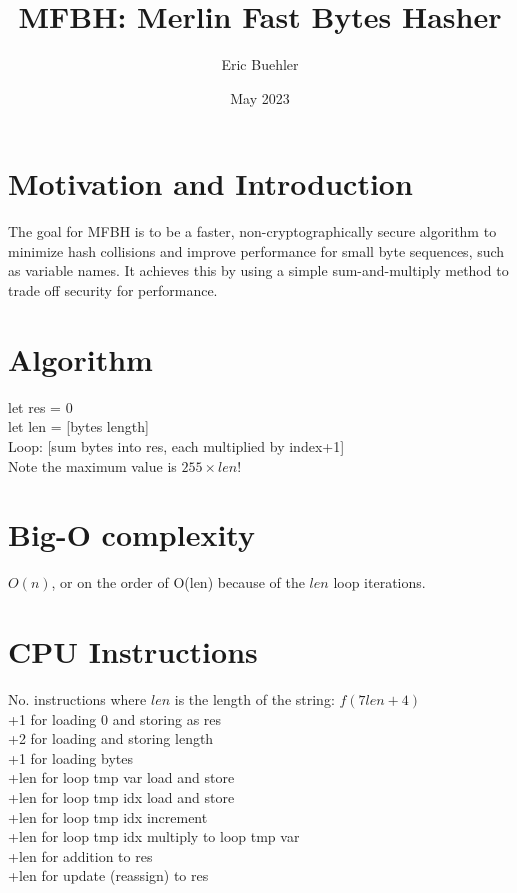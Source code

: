 \documentclass{article}
\title{MFBH: Merlin Fast Bytes Hasher}
\author{Eric Buehler}
\date{May 2023}
\begin{document}
\maketitle

\section{Motivation and Introduction}
The goal for MFBH is to be a faster, non-cryptographically secure algorithm
to minimize hash collisions and improve performance for small byte sequences, such as variable names.
It achieves this by using a simple sum-and-multiply method to trade off security for
performance.

\section{Algorithm}
let res = 0 \\
let len = [bytes length] \\
Loop: [sum bytes into res, each multiplied by index+1] \\
Note the maximum value is $255 \times len!$


\section{Big-O complexity}
$O(n)$, or on the order of O(len) because of the $len$ loop iterations.

\section{CPU Instructions}
No. instructions where $len$ is the length of the string: $f(7len+4)$ \\
+1 for loading 0 and storing as res\\
+2 for loading and storing length \\
+1 for loading bytes \\
+len for loop tmp var load and store \\
+len for loop tmp idx load and store \\
+len for loop tmp idx increment \\
+len for loop tmp idx multiply to loop tmp var \\
+len for addition to res \\
+len for update (reassign) to res \\
\end{document}
